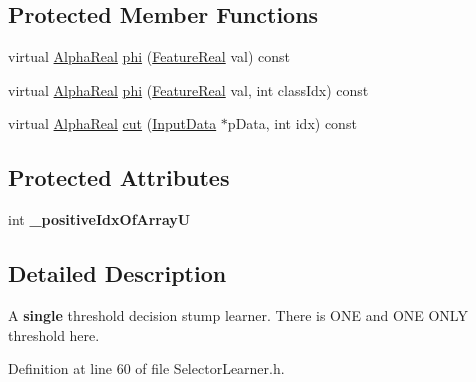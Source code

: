 \subsection*{Protected Member Functions}
\begin{DoxyCompactItemize}
\item 
virtual \hyperlink{Defaults_8h_a80184c4fd10ab70a1a17c5f97dcd1563}{AlphaReal} \hyperlink{classMultiBoost_1_1SelectorLearner_a52ec1291a8c524c62c7ce633bdc35b20}{phi} (\hyperlink{Defaults_8h_a3a11cfe6a5d469d921716ca6291e934f}{FeatureReal} val) const 
\item 
virtual \hyperlink{Defaults_8h_a80184c4fd10ab70a1a17c5f97dcd1563}{AlphaReal} \hyperlink{classMultiBoost_1_1SelectorLearner_a1feb0d8989f532ef9336b89919e7c67f}{phi} (\hyperlink{Defaults_8h_a3a11cfe6a5d469d921716ca6291e934f}{FeatureReal} val, int classIdx) const 
\item 
virtual \hyperlink{Defaults_8h_a80184c4fd10ab70a1a17c5f97dcd1563}{AlphaReal} \hyperlink{classMultiBoost_1_1SelectorLearner_a7aa861aa139b3a4747515f3796fafad9}{cut} (\hyperlink{classMultiBoost_1_1InputData}{InputData} $\ast$pData, int idx) const 
\end{DoxyCompactItemize}
\subsection*{Protected Attributes}
\begin{DoxyCompactItemize}
\item 
\hypertarget{classMultiBoost_1_1SelectorLearner_a1e4e129fb68462ec2f404151a00f6f9f}{
int {\bfseries \_\-positiveIdxOfArrayU}}
\label{classMultiBoost_1_1SelectorLearner_a1e4e129fb68462ec2f404151a00f6f9f}

\end{DoxyCompactItemize}


\subsection{Detailed Description}
A {\bfseries single} threshold decision stump learner. There is ONE and ONE ONLY threshold here. 

Definition at line 60 of file SelectorLearner.h.



